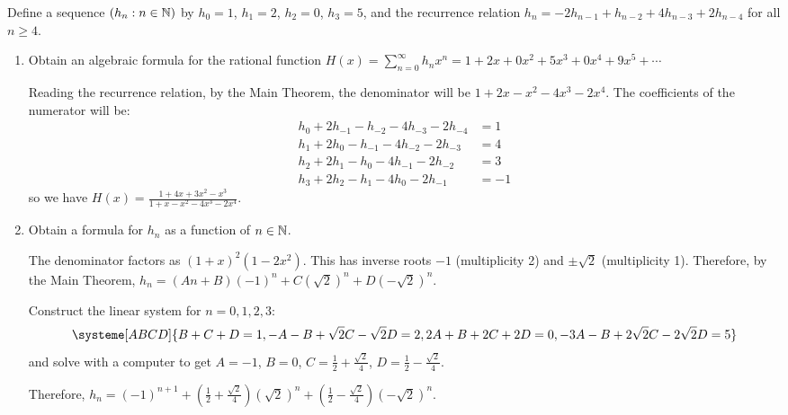 \begin{xca}
  Define a sequence $(h_n : n \in \mathbb{N})$ by
  $h_0 = 1$, $h_1 = 2$, $h_2 = 0$, $h_3 = 5$,
  and the recurrence relation $h_n = -2h_{n-1} + h_{n-2} + 4h_{n-3} + 2h_{n-4}$
  for all $n \geq 4$.
\end{xca}
\begin{enumerate}
  \item Obtain an algebraic formula for the rational function
        $H(x) = \sum_{n=0}^\infty h_n x^n = 1 + 2x + 0x^2 + 5x^3 + 0x^4 + 9x^5 + \dotsb$
        \begin{sol}
          Reading the recurrence relation, by the Main Theorem,
          the denominator will be $1 + 2x - x^2 - 4x^3 - 2x^4$.
          The coefficients of the numerator will be:
          \begin{align*}
            h_0 + 2h_{-1} - h_{-2} - 4h_{-3} - 2h_{-4} & = 1  \\
            h_1 + 2h_{0} - h_{-1} - 4h_{-2} - 2h_{-3}  & = 4  \\
            h_2 + 2h_{1} - h_{0} - 4h_{-1} - 2h_{-2}   & = 3  \\
            h_3 + 2h_{2} - h_{1} - 4h_{0} - 2h_{-1}    & = -1
          \end{align*}
          so we have $H(x) = \frac{1 + 4x + 3x^2 - x^3}{1 + x - x^2 - 4x^3 - 2x^4}$.
        \end{sol}
  \item Obtain a formula for $h_n$ as a function of $n \in \mathbb{N}$.
        \begin{sol}
          The denominator factors as $(1+x)^2(1-2x^2)$.
          This has inverse roots $-1$ (multiplicity 2)
          and $\pm\sqrt{2}$ (multiplicity 1).
          Therefore, by the Main Theorem,
          $h_n = (An+B)(-1)^n + C(\sqrt2)^n + D(-\sqrt2)^n$.

          Construct the linear system for $n=0,1,2,3$:
          \[
            \systeme[ABCD]{
            B+C+D = 1,
            -A-B+{\sqrt2}C-{\sqrt2}D = 2,
            2A + B + 2C + 2D = 0,
            -3A - B + {2\sqrt2}C - {2\sqrt2}D = 5
            }
          \]
          and solve with a computer to get
          $A = -1$, $B = 0$, $C = \frac12 + \frac{\sqrt{2}}{4}$,
          $D = \frac12 - \frac{\sqrt{2}}{4}$.

          Therefore, $h_n = (-1)^{n+1} + (\frac12 + \frac{\sqrt{2}}{4})(\sqrt{2})^n
            + (\frac12 - \frac{\sqrt{2}}{4})(-\sqrt{2})^n$.
        \end{sol}
\end{enumerate}
